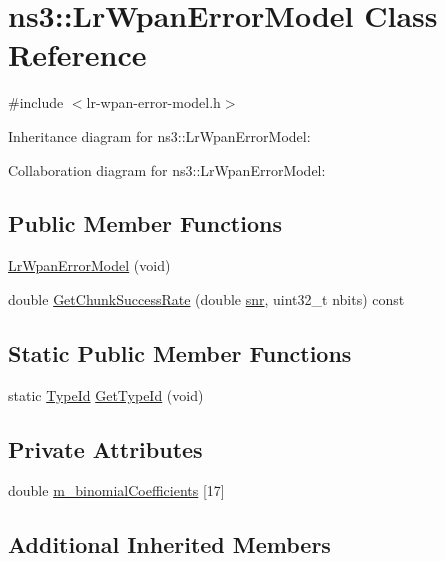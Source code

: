 \hypertarget{classns3_1_1LrWpanErrorModel}{}\section{ns3\+:\+:Lr\+Wpan\+Error\+Model Class Reference}
\label{classns3_1_1LrWpanErrorModel}


{\ttfamily \#include $<$lr-\/wpan-\/error-\/model.\+h$>$}



Inheritance diagram for ns3\+:\+:Lr\+Wpan\+Error\+Model\+:


Collaboration diagram for ns3\+:\+:Lr\+Wpan\+Error\+Model\+:
\subsection*{Public Member Functions}
\begin{DoxyCompactItemize}
\item 
\hyperlink{classns3_1_1LrWpanErrorModel_a05eb7348bec68811595cdd0856c4af44}{Lr\+Wpan\+Error\+Model} (void)
\item 
double \hyperlink{classns3_1_1LrWpanErrorModel_a6a17b1622b7fc3582b9608b94782384b}{Get\+Chunk\+Success\+Rate} (double \hyperlink{lte__pathloss_8m_ae6e82a215dff6b79fb6e9952a1b78453}{snr}, uint32\+\_\+t nbits) const 
\end{DoxyCompactItemize}
\subsection*{Static Public Member Functions}
\begin{DoxyCompactItemize}
\item 
static \hyperlink{classns3_1_1TypeId}{Type\+Id} \hyperlink{classns3_1_1LrWpanErrorModel_a4263246dbb21f928a221fe0279722292}{Get\+Type\+Id} (void)
\end{DoxyCompactItemize}
\subsection*{Private Attributes}
\begin{DoxyCompactItemize}
\item 
double \hyperlink{classns3_1_1LrWpanErrorModel_a07f8e0466e095b01a4fbba17c2806e27}{m\+\_\+binomial\+Coefficients} \mbox{[}17\mbox{]}
\end{DoxyCompactItemize}
\subsection*{Additional Inherited Members}


